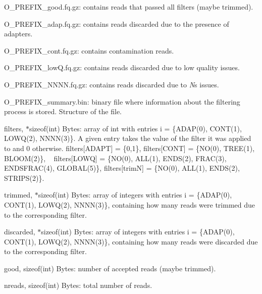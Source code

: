 \begin{DoxyItemize}
\item {\ttfamily O\+\_\+\+P\+R\+E\+F\+I\+X\+\_\+good.\+fq.\+gz}\+: contains reads that passed all filters (maybe trimmed).
\item {\ttfamily O\+\_\+\+P\+R\+E\+F\+I\+X\+\_\+adap.\+fq.\+gz}\+: contains reads discarded due to the presence of adapters.
\item {\ttfamily O\+\_\+\+P\+R\+E\+F\+I\+X\+\_\+cont.\+fq.\+gz}\+: contains contamination reads.
\item {\ttfamily O\+\_\+\+P\+R\+E\+F\+I\+X\+\_\+low\+Q.\+fq.\+gz}\+: contains reads discarded due to low quality issues.
\item {\ttfamily O\+\_\+\+P\+R\+E\+F\+I\+X\+\_\+\+N\+N\+N\+N.\+fq.\+gz}\+: contains reads discarded due to {\itshape N}\textquotesingle{}s issues.
\item {\ttfamily O\+\_\+\+P\+R\+E\+F\+I\+X\+\_\+summary.\+bin}\+: binary file where information about the filtering process is stored. Structure of the file.
\begin{DoxyItemize}
\item filters, {$\ast$sizeof(int) Bytes}\+: array of int with entries {\ttfamily i = \{A\+D\+A\+P(0), C\+O\+N\+T(1), L\+O\+W\+Q(2), N\+N\+N\+N(3)\}}. A given entry takes the value of the filter it was applied to and 0 otherwise. {\ttfamily filters\mbox{[}A\+D\+A\+PT\mbox{]} = \{0,1\}}, {\ttfamily filters\mbox{[}C\+O\+NT\mbox{]} = \{N\+O(0), T\+R\+E\+E(1), B\+L\+O\+O\+M(2)\}}, ~\newline
 {\ttfamily filters\mbox{[}L\+O\+WQ\mbox{]} = \{N\+O(0), A\+L\+L(1), E\+N\+D\+S(2), F\+R\+A\+C(3), E\+N\+D\+S\+F\+R\+A\+C(4), G\+L\+O\+B\+A\+L(5)\}}, {\ttfamily filters\mbox{[}trimN\mbox{]} = \{N\+O(0), A\+L\+L(1), E\+N\+D\+S(2), S\+T\+R\+I\+P\+S(2)\}}.
\item trimmed, {$\ast$sizeof(int) Bytes}\+: array of integers with entries i = \{A\+D\+A\+P(0), C\+O\+N\+T(1), L\+O\+W\+Q(2), N\+N\+N\+N(3)\}, containing how many reads were trimmed due to the corresponding filter.
\item discarded, {$\ast$sizeof(int) Bytes}\+: array of integers with entries i = \{A\+D\+A\+P(0), C\+O\+N\+T(1), L\+O\+W\+Q(2), N\+N\+N\+N(3)\}, containing how many reads were discarded due to the corresponding filter.
\item good, {\ttfamily sizeof(int) Bytes}\+: number of accepted reads (maybe trimmed).
\item nreads, {\ttfamily sizeof(int) Bytes}\+: total number of reads.
\end{DoxyItemize}
\end{DoxyItemize}

